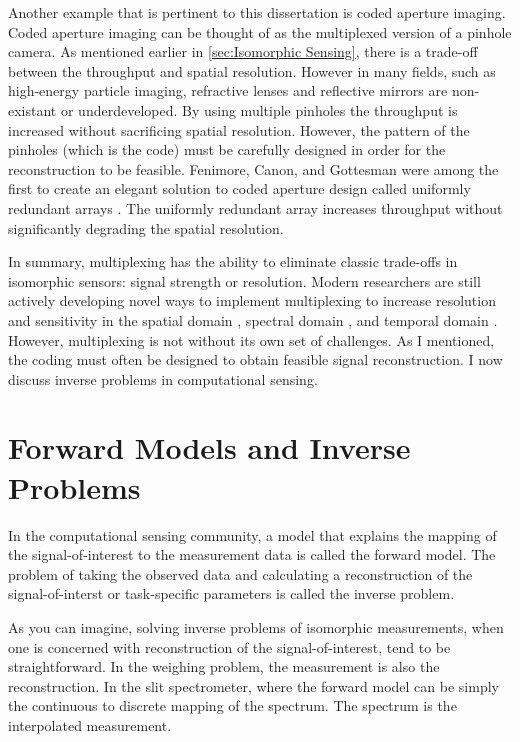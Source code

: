 Another example that is pertinent to this dissertation is coded aperture imaging. Coded aperture imaging can be thought of as the multiplexed version of a pinhole camera. As mentioned earlier in \autoref{sec:Isomorphic Sensing}, there is a trade-off between the throughput and spatial resolution. However in many fields, such as high-energy particle imaging, refractive lenses and reflective mirrors are non-existant or underdeveloped. By using multiple pinholes the throughput is increased without sacrificing spatial resolution. However, the pattern of the pinholes (which is the code) must be carefully designed in order for the reconstruction to be feasible. Fenimore, Canon, and Gottesman were among the first to create an elegant solution to coded aperture design called uniformly redundant arrays \cite{fenimore1978coded, gottesman1989new}. The uniformly redundant array increases throughput without significantly degrading the spatial resolution. 

In summary, multiplexing has the ability to eliminate classic trade-offs in isomorphic sensors: signal strength or resolution. Modern researchers are still actively developing novel ways to implement multiplexing to increase resolution and sensitivity in the spatial domain \cite{duarte2008single, townsend2012static}, spectral domain \cite{gehm2006static, tsai2013coded}, and temporal domain \cite{holloway2012flutter,llull2013coded}. However, multiplexing is not without its own set of challenges. As I mentioned, the coding must often be designed to obtain feasible signal reconstruction. I now discuss inverse problems in computational sensing.

\section{Forward Models and Inverse Problems}

In the computational sensing community, a model that explains the mapping of the signal-of-interest to the measurement data is called the \gls{forward model}. The problem of taking the observed data and calculating a reconstruction of the signal-of-interst or task-specific parameters is called the \gls{inverse problem}.

As you can imagine, solving inverse problems of isomorphic measurements, when one is concerned with reconstruction of the signal-of-interest, tend to be straightforward. In the weighing problem, the measurement is also the reconstruction. In the slit spectrometer, where the forward model can be simply the continuous to discrete mapping of the spectrum. The spectrum is the interpolated measurement. 

